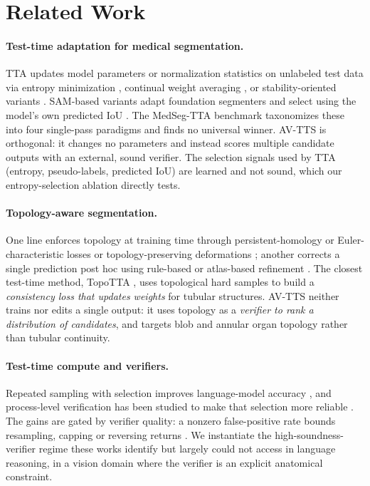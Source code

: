 \documentclass[10pt,twocolumn]{article}
\begin{document}
\section{Related Work}\label{sec:related}
\paragraph{Test-time adaptation for medical segmentation.} TTA updates model parameters or normalization statistics on unlabeled test data via entropy minimization \citep{wang2021tent}, continual weight averaging \citep{wang2022cotta}, or stability-oriented variants \citep{niu2023sar}. SAM-based variants adapt foundation segmenters and select using the model's own predicted IoU \citep{samtta2026}. The MedSeg-TTA benchmark \citep{yu2025medsegtta} taxonomizes these into four single-pass paradigms and finds no universal winner. AV-TTS is orthogonal: it changes no parameters and instead scores multiple candidate outputs with an external, sound verifier. The selection signals used by TTA (entropy, pseudo-labels, predicted IoU) are learned and not sound, which our entropy-selection ablation directly tests.

\paragraph{Topology-aware segmentation.} One line enforces topology at training time through persistent-homology or Euler-characteristic losses \citep{phloss2021,eulerchar2025} or topology-preserving deformations \citep{tedsnet2022}; another corrects a single prediction post hoc using rule-based or atlas-based refinement \citep{atlasistn2021}. The closest test-time method, TopoTTA \citep{zhou2025topotta}, uses topological hard samples to build a \emph{consistency loss that updates weights} for tubular structures. AV-TTS neither trains nor edits a single output: it uses topology as a \emph{verifier to rank a distribution of candidates}, and targets blob and annular organ topology rather than tubular continuity.

\paragraph{Test-time compute and verifiers.} Repeated sampling with selection improves language-model accuracy \citep{snell2024scaling,brown2024monkeys,wang2023self}, and process-level verification has been studied to make that selection more reliable \citep{lightman2024verify}. The gains are gated by verifier quality: a nonzero false-positive rate bounds resampling, capping or reversing returns \citep{stroebl2024verifier,setlur2025verifier}. We instantiate the high-soundness-verifier regime these works identify but largely could not access in language reasoning, in a vision domain where the verifier is an explicit anatomical constraint.
\end{document}
